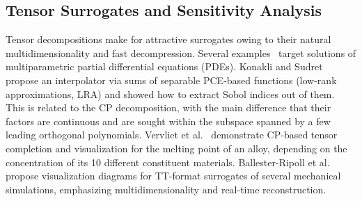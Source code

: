 \documentclass[review, twocolumn]{svjour3}          %
\newcommand{\FIXME}[1]{{\color{RED}{\textbf{FIX}: #1}}}
\begin{document}


\subsection{Tensor Surrogates and Sensitivity Analysis}



Tensor decompositions make for attractive surrogates owing to their natural multidimensionality and fast decompression. Several examples~\cite{EHLMZ:13, LME:13, DKLM:14} target solutions of multiparametric partial differential equations (PDEs). Konakli and Sudret~\cite{KS:16} propose an interpolator via sums of separable PCE-based functions (low-rank approximations, LRA) and showed how to extract Sobol indices out of them. This is related to the CP decomposition, with the main difference that their factors are continuous and are sought within the subspace spanned by a few leading orthogonal polynomials.
Vervliet et al.~\cite{VDSL:14} demonstrate CP-based tensor completion and visualization for the melting point of an alloy, depending on the concentration of its 10 different constituent materials. Ballester-Ripoll et al.~\cite{BPP:16} propose visualization diagrams for TT-format surrogates of several mechanical simulations, emphasizing multidimensionality and real-time reconstruction. 
\end{document}
